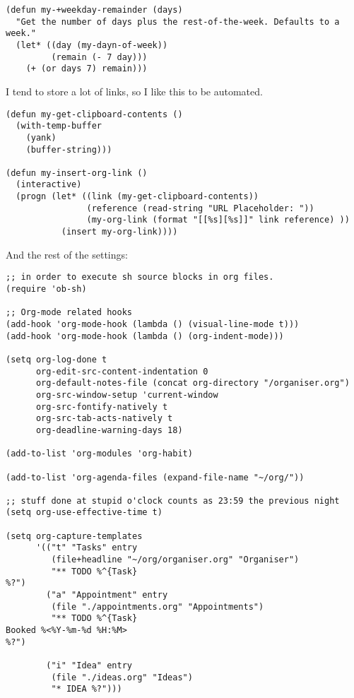 \documentclass[11pt]{article}
\begin{document}
\begin{enumerate}
\begin{verbatim}
(defun my-+weekday-remainder (days)
  "Get the number of days plus the rest-of-the-week. Defaults to a week."
  (let* ((day (my-dayn-of-week))
         (remain (- 7 day)))
    (+ (or days 7) remain)))
\end{verbatim}

I tend to store a lot of links, so I like this to be automated.

\begin{verbatim}
(defun my-get-clipboard-contents ()
  (with-temp-buffer
    (yank)
    (buffer-string)))

(defun my-insert-org-link ()
  (interactive)
  (progn (let* ((link (my-get-clipboard-contents))
                (reference (read-string "URL Placeholder: "))
                (my-org-link (format "[[%s][%s]]" link reference) ))
           (insert my-org-link))))
\end{verbatim}

And the rest of the settings:

\begin{verbatim}
;; in order to execute sh source blocks in org files.
(require 'ob-sh)

;; Org-mode related hooks
(add-hook 'org-mode-hook (lambda () (visual-line-mode t)))
(add-hook 'org-mode-hook (lambda () (org-indent-mode)))

(setq org-log-done t
      org-edit-src-content-indentation 0
      org-default-notes-file (concat org-directory "/organiser.org")
      org-src-window-setup 'current-window
      org-src-fontify-natively t
      org-src-tab-acts-natively t
      org-deadline-warning-days 18)

(add-to-list 'org-modules 'org-habit)

(add-to-list 'org-agenda-files (expand-file-name "~/org/"))

;; stuff done at stupid o'clock counts as 23:59 the previous night
(setq org-use-effective-time t)

(setq org-capture-templates
      '(("t" "Tasks" entry
         (file+headline "~/org/organiser.org" "Organiser")
         "** TODO %^{Task}
%?")
        ("a" "Appointment" entry
         (file "./appointments.org" "Appointments")
         "** TODO %^{Task}
Booked %<%Y-%m-%d %H:%M>
%?")

        ("i" "Idea" entry
         (file "./ideas.org" "Ideas")
         "* IDEA %?")))


\end{verbatim}
\end{enumerate}
\end{document}
